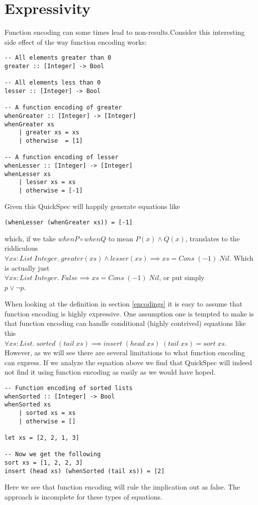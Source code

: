 \section{Expressivity}

Function encoding can some times lead to non-results.Consider this interesting side effect of the way function encoding
works:
\begin{verbatim}-- All elements greater than 0
greater :: [Integer] -> Bool

-- All elements less than 0 
lesser :: [Integer] -> Bool

-- A function encoding of greater
whenGreater :: [Integer] -> [Integer]
whenGreater xs
    | greater xs = xs
    | otherwise  = [1]

-- A function encoding of lesser 
whenLesser :: [Integer] -> [Integer]
whenLesser xs
    | lesser xs = xs
    | otherwise = [-1]\end{verbatim}
Given this QuickSpec will happily generate equations like
\begin{verbatim}(whenLesser (whenGreater xs)) = [-1]\end{verbatim}
which, if we take $whenP\circ whenQ$ to mean $P(x)\wedge Q(x)$,  translates to the riddiculous\\
$\forall xs : List\; Integer.\; greater(xs)\wedge lesser(xs)\implies xs = Cons\; (-1)\; Nil$.
Which is actually just\\$\forall xs : List\; Integer.\; False\implies xs = Cons\; (-1)\; Nil$,
or put simply\\$p\vee \neg p$.

When looking at the definition in 
section \ref{encodings} it is easy to assume
that function encoding is highly expressive.
One assumption one is tempted to make is that
function encoding can handle conditional (highly contrived)
equations like this\\
$\forall xs : List.\;sorted\;(tail\; xs) \implies insert\;(head\;xs)\;(tail\;xs)=sort\;xs$.
However, as we will see there are several limitations to what function encoding can express.
If we analyze the equation above we find that QuickSpec will indeed not find it
using function encoding as easily as we would have hoped.
\begin{verbatim}-- Function encoding of sorted lists
whenSorted :: [Integer] -> Bool
whenSorted xs
    | sorted xs = xs
    | otherwise = []

let xs = [2, 2, 1, 3]

-- Now we get the following
sort xs = [1, 2, 2, 3]
insert (head xs) (whenSorted (tail xs)) = [2]\end{verbatim}
Here we see that function encoding will rule the implication out as false. The approach is
incomplete for these types of equations.

